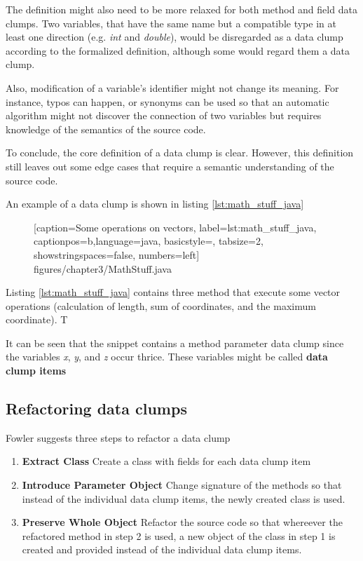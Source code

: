 The definition might also need to be more relaxed for both method and field data clumps. Two variables, that have the same name but a compatible type in at least one direction  (e.g. \textit{int} and  \textit{double}), would be disregarded as a data clump according to the formalized definition, although some would regard them a data clump.

Also, modification of a variable's identifier might not change its meaning. For instance, typos can happen, or synonyms can be used so that an automatic algorithm might not discover the connection of two variables but requires  knowledge of the semantics of the source code. \cite{zhangImprovingPrecisionFowler2008}


To conclude, the core definition of a data clump is clear. However, this definition still leaves out some edge cases that require a semantic understanding of the source code. 

An example of a data clump is shown in listing \ref{lst:math_stuff_java}
\begin{figure} [htbp!]
			
			[caption={Some operations on vectors},
			label={lst:math_stuff_java},
			captionpos=b,language=java, basicstyle=\footnotesize, tabsize=2, showstringspaces=false,  numbers=left]
			{figures/chapter3/MathStuff.java}
		\end{figure}



Listing \ref{lst:math_stuff_java} contains three method that execute some vector operations (calculation of length, sum of coordinates, and the maximum coordinate). T


It can be seen that  the snippet contains a method parameter data clump since the variables \textit{x}, \textit{y}, and  \textit{z} occur thrice.  These variables might be called \textbf{data clump items}
  
\subsection{Refactoring data clumps}
Fowler suggests three steps to refactor a data clump
\begin{enumerate}
    \item \textbf{Extract Class} Create a class with fields for each data clump item
    \item \textbf{Introduce Parameter Object} Change signature of the methods so that instead of the individual data clump items, the newly created class is used. 
    \item \textbf{Preserve Whole Object} Refactor the source code so that whereever the refactored method in step 2 is used, a new object of the class in step 1 is created and provided instead of the individual data clump items.
\end{enumerate}


